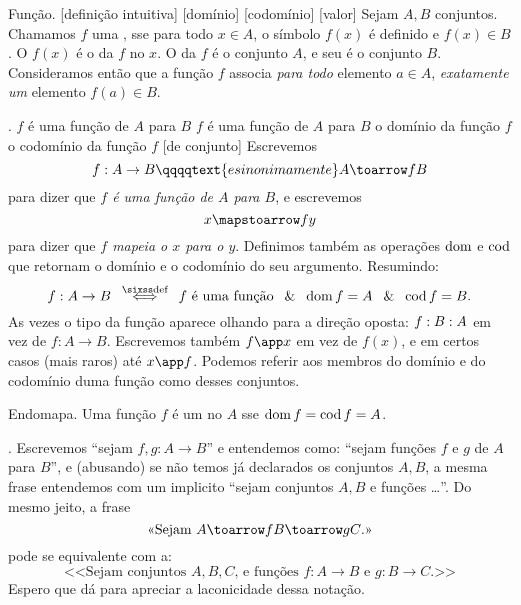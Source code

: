 \pseudodefinition Função.
\label{function_pseudodefinition}%
%
%
[definição intuitiva]%
[domínio]%
[codomínio]%
[valor]%
Sejam $A,B$ conjuntos.
Chamamos $f$ uma , sse
para todo $x \in A$, o símbolo $f(x)$ é definido e $f(x)\in B$.
O $f(x)$ é o  da $f$ no $x$.
O  da $f$ é o conjunto $A$,
e seu  é o conjunto $B$.
Consideramos então que a função $f$ associa \emph{para todo} elemento $a \in A$,
\emph{exatamente um} elemento $f(a) \in B$.

.
\label{function_notation}%
 {$f$ é uma função de $A$ para $B$}%
 {$f$ é uma função de $A$ para $B$}%
 {o domínio da função $f$}%
 {o codomínio da função $f$}%
[de conjunto]%
Escrevemos
$$
f : A \to B
\qqqqtext{e sinonimamente}
A \toarrow f B
$$
para dizer que \emph{$f$ é uma função de $A$ para $B$},
e escrevemos
$$
x \mapstoarrow f y
$$
para dizer que \emph{$f$ mapeia o $x$ para o $y$}.
Definimos também as operações $\operatorname{dom}$ e $\operatorname{cod}$
que retornam o domínio e o codomínio do seu argumento.
Resumindo:
$$
f : A \to B
\quad\defiff\quad
\text{$f$ é uma função}
\;\mland\;
\dom f = A
\;\mland\;
\cod f = B.
$$
As vezes o tipo da função aparece olhando para a direção oposta:
$f : B : A$ em vez de $f : A \to B$.
Escrevemos também $f\app x$ em vez de $f(x)$,
e em certos casos (mais raros) até $x\app f$.
Podemos referir aos membros do domínio e do codomínio duma
função como  desses conjuntos.

 Endomapa.
\label{endomapping}%
%
Uma função $f$ é um  no $A$ sse $\operatorname{dom} f = \operatorname{cod} f = A$.

\note.
Escrevemos ``sejam $f,g : A \to B$'' e entendemos como:
``sejam funções $f$ e $g$ de $A$ para $B$'', e (abusando) se não temos já
declarados os conjuntos $A,B$, a mesma frase entendemos com um implicito
``sejam conjuntos $A,B$ e funções \dots''.
Do mesmo jeito, a frase
$$
\text{<<{Sejam $A \toarrow f B \toarrow g C$.}>>}
$$
pode se equivalente com a:
$$
\text{<<{Sejam conjuntos $A,B,C$, e funções $f:A\to B$ e $g:B\to C$.}>>}
$$
Espero que dá para apreciar a laconicidade dessa notação.

